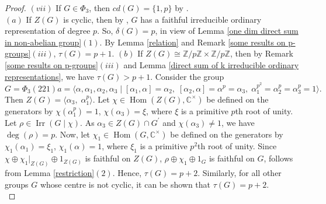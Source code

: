 \documentclass[a4paper,11pt]{amsart}
\numberwithin{equation}{section}
\numberwithin{equation}{subsection}
\newcommand{\Z}{\mathbb{Z}}
\newcommand{\tg}{\tau(G)}
\newcommand{\poonam}[1]{{\color{blue} #1}}
\begin{document}
\begin{proof}

$(vii)$ 
If $G \in \Phi_{3}$, then $cd(G)=\{1,p\}$ by \cite[Lemma 5.3]{Prajapati}. \\
$(a)$ If $Z(G)$ is cyclic, then by \cite[Theorem 2.32(b)]{isaacs}, $G$ has a faithful irreducible ordinary representation of degree $p$. So, $\delta(G)= p$, in view of Lemma \ref{one dim direct sum in non-abelian group}$(1)$. By Lemma \ref{relation} and Remark \ref{some results on p-groups}$(iii)$, $\tau(G) = p+1$. %
$(b)$ If $Z(G)\cong \Z/p\Z \times \Z/p\Z$, then by Remark \ref{some results on p-groups}$(iii)$ and Lemma \ref{direct sum of k irreducible ordinary representations}, we have $\tau(G) > p+1$. 
Consider the group $$G= \Phi_{3}(221)a= \langle \alpha, \alpha_1, \alpha_2, \alpha_3
\mid [\alpha_1,\alpha]= \alpha_2,\; [\alpha_2,\alpha]= \alpha^{p}= \alpha_3,\;
\alpha_1^{p^2}= \alpha_2^{p}= \alpha_3^{p} =1 \rangle.$$ Then $Z(G)= \langle \alpha_3,\; \alpha_1^{p} \rangle$. Let $\chi \in \operatorname{Hom}(Z(G),\mathbb{C}^{\times})$ be defined on the generators by $\chi(\alpha_1^{p}) = 1$, $\chi(\alpha_3)= \xi$, where $\xi$ is a primitive $p$th root of unity. Let $\rho \in \operatorname{Irr}(G \mid \chi)$. As $\alpha_3 \in Z(G) \cap G^\prime$ and $\chi(\alpha_3)\neq 1$, we have $\operatorname{deg}(\rho)= p$. 
Now, let $\chi_1 \in \operatorname{Hom}(G,\mathbb{C}^{\times})$ be defined on the generators by $\chi_1(\alpha_1)= \xi_1$, $\chi_1(\alpha)=1$, where $\xi_1$ is a primitive $p^2$th root of unity. Since $\chi \oplus \chi_1|_{Z(G)} \oplus 1_{Z(G)}$ is faithful on $Z(G)$, $\rho \oplus \chi_1 \oplus 1_G$ is faithful on $G$, follows from Lemma \ref{restriction}$(2)$. Hence, $\tau(G) = p+2$.  %
Similarly, for all other groups $G$ whose centre is not cyclic, it can be shown that $\tg = p+2$. \\


\end{proof}
\end{document}
